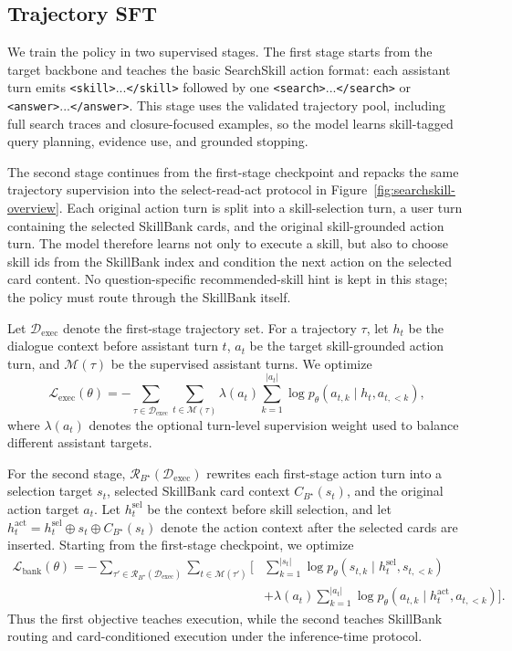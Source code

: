 \documentclass{article}
\newcommand{\tagopen}[2]{\texttt{\textcolor{#1}{<#2>}}}
\newcommand{\tagclose}[2]{\texttt{\textcolor{#1}{</#2>}}}
\begin{document}
\subsection{Trajectory SFT}
We train the policy in two supervised stages. The first stage starts from the target backbone and teaches the basic SearchSkill action format: each assistant turn emits \tagopen{skilltagcolor}{skill}...\tagclose{skilltagcolor}{skill} followed by one \tagopen{searchtagcolor}{search}...\tagclose{searchtagcolor}{search} or \tagopen{answertagcolor}{answer}...\tagclose{answertagcolor}{answer}. This stage uses the validated trajectory pool, including full search traces and closure-focused examples, so the model learns skill-tagged query planning, evidence use, and grounded stopping.

The second stage continues from the first-stage checkpoint and repacks the same trajectory supervision into the select-read-act protocol in Figure~\ref{fig:searchskill-overview}. Each original action turn is split into a skill-selection turn, a user turn containing the selected SkillBank cards, and the original skill-grounded action turn. The model therefore learns not only to execute a skill, but also to choose skill ids from the SkillBank index and condition the next action on the selected card content. No question-specific recommended-skill hint is kept in this stage; the policy must route through the SkillBank itself.

Let \(\mathcal{D}_{\mathrm{exec}}\) denote the first-stage trajectory set. For a trajectory \(\tau\), let \(h_t\) be the dialogue context before assistant turn \(t\), \(a_t\) be the target skill-grounded action turn, and \(\mathcal{M}(\tau)\) be the supervised assistant turns. We optimize
\[
\mathcal{L}_{\mathrm{exec}}(\theta)
=
- \sum_{\tau\in\mathcal{D}_{\mathrm{exec}}}
\sum_{t\in\mathcal{M}(\tau)}
\lambda(a_t)
\sum_{k=1}^{|a_t|}
\log p_{\theta}(a_{t,k}\mid h_t,a_{t,<k}),
\]
where \(\lambda(a_t)\) denotes the optional turn-level supervision weight used to balance different assistant targets.

For the second stage, \(\mathcal{R}_{B^\star}(\mathcal{D}_{\mathrm{exec}})\) rewrites each first-stage action turn into a selection target \(s_t\), selected SkillBank card context \(C_{B^\star}(s_t)\), and the original action target \(a_t\). Let \(h_t^{\mathrm{sel}}\) be the context before skill selection, and let \(h_t^{\mathrm{act}}=h_t^{\mathrm{sel}}\oplus s_t\oplus C_{B^\star}(s_t)\) denote the action context after the selected cards are inserted. Starting from the first-stage checkpoint, we optimize
\[
\begin{aligned}
\mathcal{L}_{\mathrm{bank}}(\theta)
=
- \sum_{\tau'\in\mathcal{R}_{B^\star}(\mathcal{D}_{\mathrm{exec}})}
\sum_{t\in\mathcal{M}(\tau')}
\Bigg[
&\sum_{k=1}^{|s_t|}
\log p_{\theta}(s_{t,k}\mid h_t^{\mathrm{sel}},s_{t,<k}) \\
&+
\lambda(a_t)
\sum_{k=1}^{|a_t|}
\log p_{\theta}(a_{t,k}\mid h_t^{\mathrm{act}},a_{t,<k})
\Bigg].
\end{aligned}
\]
Thus the first objective teaches execution, while the second teaches SkillBank routing and card-conditioned execution under the inference-time protocol.
\end{document}

